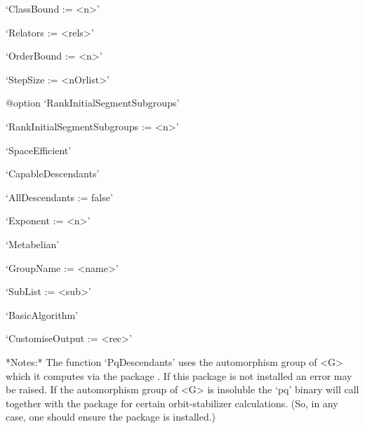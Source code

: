 \beginlist%

\item{}`ClassBound := <n>'

\item{}`Relators := <rels>'

\item{}`OrderBound := <n>'

\item{}`StepSize := <nOrlist>'

%
{@option \noexpand`RankInitialSegmentSubgroups'}
\item{}`RankInitialSegmentSubgroups := <n>'

\item{}`SpaceEfficient'

\item{}`CapableDescendants'

\item{}`AllDescendants := false'

\item{}`Exponent := <n>'

\item{}`Metabelian'

\item{}`GroupName := <name>'

\item{}`SubList := <sub>'

\item{}`BasicAlgorithm'

\item{}`CustomiseOutput := <rec>'

\endlist

*Notes:*
The function `PqDescendants' uses the automorphism group of <G> which  it
computes via the package {\AutPGrp}. If this package is not installed  an
error may be raised. If the automorphism group of <G>  is  insoluble  the
`pq' binary will call {\GAP} together with  the  {\AutPGrp}  package  for
certain orbit-stabilizer calculations.  (So,  in  any  case,  one  should
ensure the {\AutPGrp} package is installed.)


